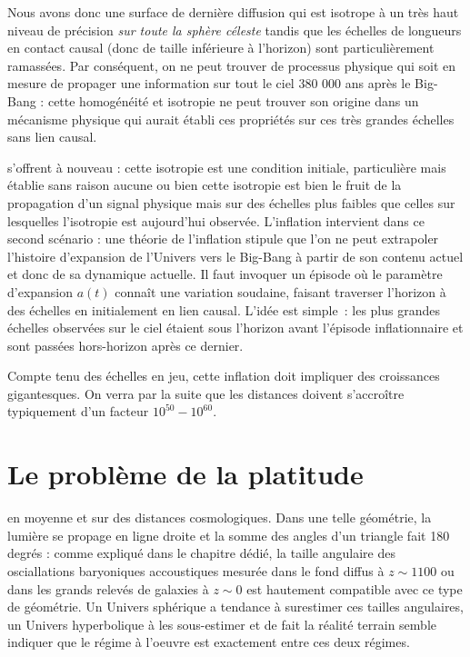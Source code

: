 Nous avons donc une surface de dernière diffusion qui est isotrope à un très haut niveau de précision \textit{sur toute la sphère céleste} tandis que les échelles de longueurs en contact causal (donc de taille inférieure à l'horizon) sont particulièrement ramassées. Par conséquent, on ne peut trouver de processus physique qui soit en mesure de propager une information sur tout le ciel 380 000 ans après le Big-Bang : cette homogénéité et isotropie ne peut trouver son origine dans un mécanisme physique qui aurait établi ces propriétés sur ces très grandes échelles sans lien causal.

 s'offrent à nouveau : cette isotropie est une condition initiale, particulière mais établie sans raison aucune ou bien cette isotropie est bien le fruit de la propagation d'un signal physique mais sur des échelles plus faibles que celles sur lesquelles l'isotropie est aujourd'hui observée. L'inflation intervient dans ce second scénario : une théorie de l'inflation stipule que l'on ne peut extrapoler l'histoire d'expansion de l'Univers vers le Big-Bang à partir de son contenu actuel et donc de sa dynamique actuelle. Il faut invoquer un épisode où le paramètre d'expansion $a(t)$ connaît une variation soudaine, faisant traverser l'horizon à des échelles en initialement en lien causal. L'idée est simple~: les plus grandes échelles observées sur le ciel étaient sous l'horizon avant l'épisode inflationnaire et sont passées hors-horizon après ce dernier. 

Compte tenu des échelles en jeu, cette inflation doit impliquer des croissances gigantesques. On verra par la suite que les distances doivent s'accroître typiquement d'un facteur $10^{50}-10^{60}$.

\section{Le problème de la platitude}
 en moyenne et sur des distances cosmologiques. Dans une telle géométrie, la lumière se propage en ligne droite et la somme des angles d'un triangle fait 180 degrés : comme expliqué dans le chapitre dédié, la taille angulaire des osciallations baryoniques accoustiques mesurée dans le fond diffus à $z\sim1100$ ou dans les grands relevés de galaxies à $z\sim 0$ est hautement compatible avec ce type de géométrie. Un Univers sphérique a tendance à surestimer ces tailles angulaires, un Univers hyperbolique à les sous-estimer et de fait la réalité terrain semble indiquer que le régime à l'oeuvre est exactement entre ces deux régimes.

